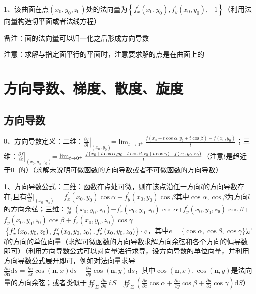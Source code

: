 1、该曲面在点$\left(x_{0}, y_{0}, z_{0}\right)$处的法向量为$\left\{f_{x}^{\prime}\left(x_{0}, y_{0}\right),f_{y}^{\prime}\left(x_{0}, y_{0}\right),-1\right\}$（利用法向量构造切平面或者法线方程）

备注：面的法向量可以归一化之后形成方向导数

注意：求解与指定面平行的平面时，注意要求解的点是在曲面上的



\section{方向导数、梯度、散度、旋度}



\subsection{方向导数}

0、方向导数定义：二维：$\left.\frac{\partial f}{\partial l}\right|_{\left(x_{0}, y_{0}\right)}$=$\lim _{t \rightarrow 0^{+}} \frac{f\left(x_{0}+t \cos \alpha, y_{0}+t \cos \beta\right)-f\left(x_{0}, y_{0}\right)}{t}$；三维：$\left.\frac{\partial f}{\partial l}\right|_{\left(x_{0}, y_{0}, z_{0}\right)}$=$\newline\lim _{t \rightarrow 0^{+}} \frac{f\left(x_{0}+t \cos \alpha, y_{0}+t \cos \beta, z_{0}+t \cos \gamma\right)-f\left(x_{0}, y_{0}, z_{0}\right)}{t}$（注意$t$是趋近于$0^+$的）（求解未说明可微函数的方向导数或者不可微函数的方向导数）

1、方向导数公式：二维：函数在点处可微，则在该点沿任一方向$l$的方向导数存在,且有$\frac{\partial f}{\partial l}|_{\left(x_{0}, y_{0}\right)}= f_{x}^{\prime}(x_{0},y_{0}) \cos \alpha+f_{y}^{\prime}\left(x_{0}, y_{0}\right) \cos \beta$其中$\cos \alpha, \cos \beta$为方向$l$的方向余弦；三维：$\frac{d f}{\partial l}|{\left(x_{0}, y_{0}, z_{0}\right)} $=$f_{x}^{\prime}\left(x_{0}, y_{0}, z_{0}\right) \cos \alpha$+$f_{y}^{\prime}\left(x_{0}, y_{0}, z_{0}\right) \cos \beta$+$f_{y}^{\prime}\left(x_{0}, y_{0}, z_{0}\right) \cos \beta+f_{z}^{\prime}\left(x_{0}, y_{0}, z_{0}\right) \cos \gamma$=$\newline\left\{f_{x}^{\prime}\left(x_{0}, y_{0}, z_{0}\right), f_{y}^{\prime}\left(x_{0}, y_{0}, z_{0}\right), f_{z}^{\prime}\left(x_{0}, y_{0}, z_{0}\right)\right\} \cdot e$，其中$e=\{\cos \alpha, \cos \beta, \cos \gamma\}$是$l$的方向的单位向量（求解可微函数的方向导数求解方向余弦和各个方向的偏导数即可）（利用方向导数公式可以对向量进行求导，设方向导数的单位向量，并利用方向导数公式展开即可，例如对法向量求导$\frac{\partial u}{\partial \boldsymbol{n}} \mathrm{d} s=\frac{\partial u}{\partial x} \cos (\boldsymbol{n}, x) \mathrm{d} s+\frac{\partial u}{\partial y} \cos (\boldsymbol{n}, y) \mathrm{d} s$，其中$\cos (\boldsymbol{n}, x) ,\cos (\boldsymbol{n}, y)$是法向量的方向余弦；或者类似于$\oiint_{\Sigma} \frac{\partial u}{\partial n} \mathrm{~d} S$=$\oiint_{\Sigma}(\frac{\partial u}{\partial x} \cos \alpha+\frac{\partial u}{\partial y} \cos \beta+\frac{\partial u}{\partial z} \cos \gamma) \mathrm{d} S$）

